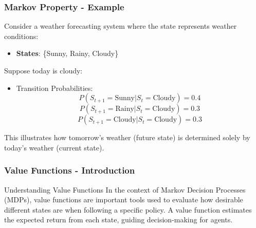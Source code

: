 \documentclass[aspectratio=169]{beamer}
\begin{document}
\begin{frame}[fragile]
    \frametitle{Markov Property - Example}
    Consider a weather forecasting system where the state represents weather conditions:
    \begin{itemize}
        \item \textbf{States}: \{Sunny, Rainy, Cloudy\}
    \end{itemize}
    Suppose today is cloudy:
    \begin{itemize}
        \item Transition Probabilities:
        \begin{equation}
            P(S_{t+1} = \text{Sunny} | S_t = \text{Cloudy}) = 0.4
        \end{equation}
        \begin{equation}
            P(S_{t+1} = \text{Rainy} | S_t = \text{Cloudy}) = 0.3
        \end{equation}
        \begin{equation}
            P(S_{t+1} = \text{Cloudy} | S_t = \text{Cloudy}) = 0.3
        \end{equation}
    \end{itemize}
    This illustrates how tomorrow's weather (future state) is determined solely by today's weather (current state).
\end{frame}

\begin{frame}[fragile]
    \frametitle{Value Functions - Introduction}
    \begin{block}{Understanding Value Functions}
        In the context of Markov Decision Processes (MDPs), value functions are important tools used to evaluate how desirable different states are when following a specific policy. A value function estimates the expected return from each state, guiding decision-making for agents.
    \end{block}
\end{frame}
\end{document}
